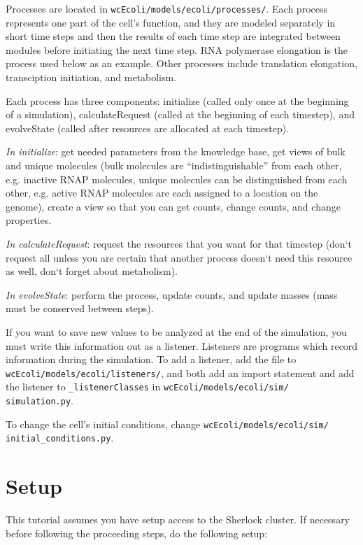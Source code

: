 \documentclass[12pt]{article}
\begin{document}
Processes are located in \texttt{wcEcoli/models/ecoli/processes/}. Each process represents one part of the cell's function, and they are modeled separately in short time steps and then the results of each time step are integrated between modules before initiating the next time step. RNA polymerase elongation is the process used below as an example. Other processes include translation elongation, transciption initiation, and metabolism.
\par
Each process has three components: initialize (called only once at the beginning of a simulation), calculateRequest (called at the beginning of each timestep), and evolveState (called after resources are allocated at each timestep).
\par
\emph{In initialize}: get needed parameters from the knowledge base, get views of bulk and unique molecules (bulk molecules are “indistinguishable” from each other, e.g. inactive RNAP molecules, unique molecules can be distinguished from each other, e.g. active RNAP molecules are each assigned to a location on the genome), create a view so that you can get counts, change counts, and change properties.
\par
\emph{In calculateRequest}: request the resources that you want for that timestep (don`t request all unless you are certain that another process doesn`t need this resource as well, don`t forget about metabolism).
\par
\emph{In evolveState}: perform the process, update counts, and update masses (mass must be conserved between steps).
\par
If you want to save new values to be analyzed at the end of the simulation, you must write this information out as a listener. Listeners are programs which record information during the simulation. To add a listener, add the file to \texttt{wcEcoli/models/ecoli/listeners/}, and both add an import statement and add the listener to \texttt{\_listenerClasses} in \texttt{wcEcoli/models/ecoli/sim/ \allowbreak simulation.py}.
\par
To change the cell's initial conditions, change \texttt{wcEcoli/models/ecoli/sim/ \allowbreak initial\_conditions.py}.
\par

\section{Setup}
\label{sec:setup}

This tutorial assumes you have setup access to the Sherlock cluster. If necessary before following the proceeding steps, do the following setup:
\end{document}
